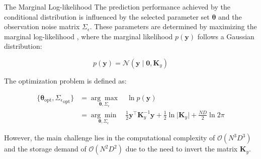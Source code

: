\begin{frame}{The Marginal Log-likelihood}
	\justifying
	The prediction performance achieved by the conditional distribution is influenced by the selected parameter set $\bm{\theta}$ and the observation noise matrix $\Sigma_\epsilon$. These parameters are determined by maximizing the marginal log-likelihood                                                                                                                                                                                                                                                                                , where the marginal likelihood $p(\mathbf{y})$ follows a Gaussian distribution:
	
	\[
	p(\mathbf{y}) = \mathcal{N}(\mathbf{y} \mid \bm{0}, \mathbf{K}_y)
	\]
	
	The optimization problem is defined as:
	
	\begin{equation*}\label{eq:sogp_nlml_opt}
		\begin{aligned}
			\{\bm{\theta}_{\text{opt}}, {\Sigma_\epsilon}_{\text{opt}}\} &= \underset{\bm{\theta}, \Sigma_\epsilon}{\arg\max} \quad \ln p(\mathbf{y}) \\
			&= \underset{\bm{\theta}, \Sigma_\epsilon}{\arg\min} \quad \frac{1}{2} \mathbf{y}^\top \mathbf{K}_y^{-1} \mathbf{y} + \frac{1}{2} \ln \lvert \mathbf{K}_y \rvert + \frac{ND}{2} \ln 2\pi
		\end{aligned}
	\end{equation*}
	
	\vspace{3mm}
	\justifying
	However, the main challenge lies in the computational complexity of $\mathcal{O}(N^3D^3)$ and the storage demand of $\mathcal{O}(N^2D^2)$ due to the need to invert the matrix $\mathbf{K}_y$.
\end{frame}


